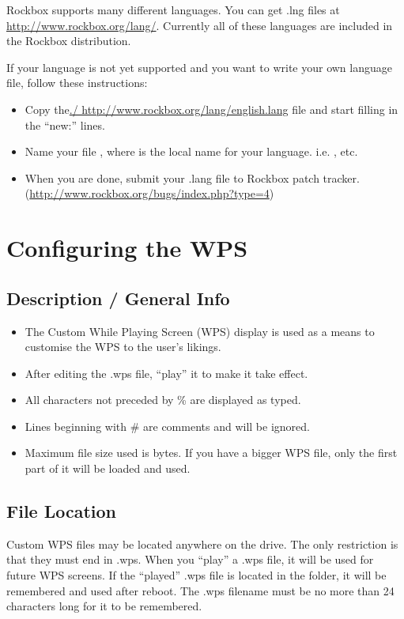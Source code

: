 Rockbox supports many different languages. You can get .lng files at \url{http://www.rockbox.org/lang/}.
Currently all of these languages are included in the Rockbox
distribution.

If your language is not yet supported and you want to write your own language file,  follow these instructions:

\begin{itemize}
\item Copy the\url{./ http://www.rockbox.org/lang/english.lang} file and start filling in the ``new:'' lines.
\item Name your file , where
 is the local name for your language. i.e. ,  etc.
\item When you are done, submit your .lang file to Rockbox patch tracker.\\
  (\url{http://www.rockbox.org/bugs/index.php?type=4})
\end{itemize}

\section{\label{ref:ConfiguringtheWPS}Configuring the WPS}

\subsection{Description / General Info}

\begin{itemize}
\item The Custom While Playing Screen (WPS) display is used as a means to customise the WPS to the user's likings.
\item After editing the .wps file, ``play'' it to make it take effect.
\item All characters not preceded by \% are displayed as typed.
\item Lines beginning with \# are comments and will be ignored.
\item Maximum file size used is  bytes. If you have a bigger WPS file, only the first part of it will be loaded and used.
\end{itemize}

\subsection{File Location}
Custom WPS files may be located anywhere on the drive. The only restriction is that they must end in .wps. When you ``play'' a .wps file, it will be used for future WPS screens. If the ``played'' .wps file is located in the  folder, it will be remembered and used after reboot. The .wps filename must be no more than 24 characters long for it to be remembered.

